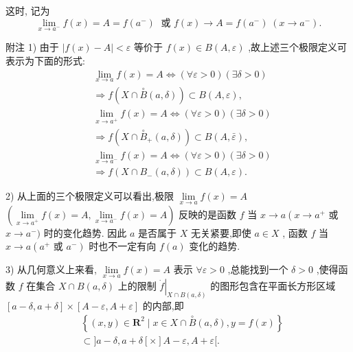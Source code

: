 这时, 记为
$$\mathop{\lim }\limits_{{x \rightarrow  {a}^{ - }}}f\left( x\right)  = A = f\left( {a}^{ - }\right) \;\text{ 或 }f\left( x\right)  \rightarrow  A = f\left( {a}^{ - }\right) \;\left( {x \rightarrow  {a}^{ - }}\right) .$$

附注 1) 由于 $\left| {f\left( x\right)  - A}\right|  < \varepsilon$ 等价于 $f\left( x\right)  \in  B\left( {A,\varepsilon }\right)$ ,故上述三个极限定义可表示为下面的形式:
\begin{align*}
	&\mathop{\lim }\limits_{{x \rightarrow  a}}f\left( x\right)  = A \Leftrightarrow  \left( {\forall \varepsilon  > 0}\right) \left( {\exists \delta  > 0}\right)\\
	&\Rightarrow  f\left( {X \cap  \overset{ \circ  }{B}\left( {a,\delta }\right) }\right)  \subset  B\left( {A,\varepsilon }\right) ,\\
	&\mathop{\lim }\limits_{{x \rightarrow  {a}^{ + }}}f\left( x\right)  = A \Leftrightarrow  \left( {\forall \varepsilon  > 0}\right) \left( {\exists \delta  > 0}\right)\\
	&\Rightarrow  f\left( {X \cap  {\overset{ \circ  }{B}}_{ + }\left( {a,\delta }\right) }\right)  \subset  B\left( {A,\bar{\varepsilon }}\right) ,\\
	&\mathop{\lim }\limits_{{x \rightarrow  {a}^{ - }}}f\left( x\right)  = A \Leftrightarrow  \left( {\forall \varepsilon  > 0}\right) \left( {\exists \delta  > 0}\right)\\
	&\Rightarrow  f\left( {X \cap  {B}_{ - }\left( {a,\delta }\right) }\right)  \subset  B\left( {A,\varepsilon }\right) .
\end{align*}

2) 从上面的三个极限定义可以看出,极限 $\mathop{\lim }\limits_{{x \rightarrow  a}}f\left( x\right)  = A$  $\left( {\mathop{\lim }\limits_{{x \rightarrow  {a}^{ + }}}f\left( x\right)  = A,\mathop{\lim }\limits_{{x \rightarrow  {a}^{ - }}}f\left( x\right)  = A}\right)$ 反映的是函数 $f$ 当 $x \rightarrow  a\left( {x \rightarrow  {a}^{ + }}\right.$ 或 $x \rightarrow  {a}^{ - })$ 时的变化趋势. 因此 $a$ 是否属于 $X$ 无关紧要,即使 $a \in  X$ , 函数 $f$ 当 $x \rightarrow  a\left( {a}^{ + }\right.$ 或 $\left. {a}^{ - }\right)$ 时也不一定有向 $f\left( a\right)$ 变化的趋势.

3) 从几何意义上来看, $\mathop{\lim }\limits_{{x \rightarrow  a}}f\left( x\right)  = A$ 表示 $\forall \varepsilon  > 0$ ,总能找到一个 $\delta  > 0$ ,使得函数 $f$ 在集合 $X \cap  B\left( {a,\delta }\right)$ 上的限制 ${\left. \dot{f}\right| }_{X \cap  B\left( {a,\delta }\right) }$ 的图形包含在平面长方形区域 $\left\lbrack  {a - \delta ,a + \delta }\right\rbrack   \times  \left\lbrack  {A - \varepsilon ,A + \varepsilon }\right\rbrack$ 的内部,即
\begin{align*}
	&\left\{  {\left( {x,y}\right)  \in  {\mathbf{R}}^{2} \mid  x \in  X \cap  \overset{ \circ  }{B}\left( {a,\delta }\right) ,y = f\left( x\right) }\right\}\\
	&\subset  \rbrack a - \delta ,a + \delta \left\lbrack  \times \right\rbrack  A - \varepsilon ,A + \varepsilon \lbrack .
\end{align*}

